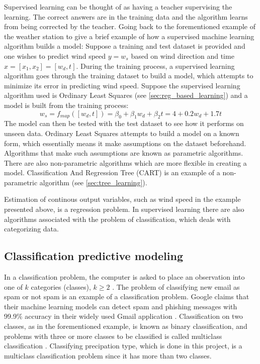 
	Supervised learning can be thought of as having a teacher supervising the learning. The correct answers are in the training data and the algorithm learns from being corrected by the teacher. Going back to the forementioned example of the weather station to give a brief example of how a supervised machine learning algorithm builds a model: Suppose a training and test dataset is provided and one wishes to predict wind speed $y = w_s$ based on wind direction and time $x = [x_1, x_2] = [w_d, t]$. During the training process, a supervised learning algorithm goes through the training dataset to build a model, which attempts to minimize its error in predicting wind speed. Suppose the supervised learning algorithm used is Ordinary Least Squares (see \ref{sec:reg_based_learning}) and a model is built from the training process: 
\begin{equation} \label{eq:example_ws}
	w_s = f_{map}([w_d, t]) = \beta_0 + \beta_1 w_d + \beta_2 t = 4 + 0.2w_d + 1.7t
\end{equation}
	The model can then be tested with the test dataset to see how it performs on unseen data. Ordinary Least Squares attempts to build a model on a known form, which essentially means it make assumptions on the dataset beforehand. Algorithms that make such assumptions are known as parametric algorithms. There are also non-parametric algorithms which are more flexible in creating a model. Classification And Regression Tree (CART) is an example of a non-parametric algorithm (see \ref{sec:tree_learning}). %

	Estimation of continous output variables, such as wind speed in the example presented above, is a regression problem. In supervised learning there are also algorithms associated with the problem of classification, which deals with categorizing data.


	\subsection{Classification predictive modeling} \label{sec:classification}
	In a classification problem, the computer is asked to place an observation into one of $k$ categories (classes), $k \geq 2$ \cite{BOOK:1}. The problem of classifying new email as spam or not spam is an example of a classification problem. Google claims that their machine learning models can detect spam and phishing messages with 99.9\% accuracy in their widely used Gmail application \cite{WEBSITE:4}. Classification on two classes, as in the forementioned example, is known as binary classification, and problems with three or more classes to be classified is called multiclass classification \cite{MISC:1}. Classifying precipation type, which is done in this project, is a multiclass classification problem since it has more than two classes.

